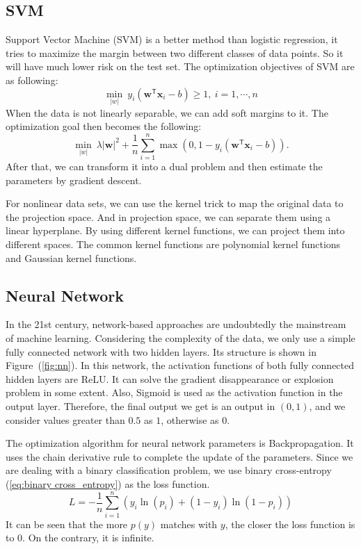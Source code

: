 \documentclass[11pt, a4paper, jou]{apa7}
\begin{document}
\subsection{SVM}
    Support Vector Machine (SVM) is a better method than logistic regression, it tries to maximize the margin between two different classes of data points. So it will have much lower risk on the test set. The optimization objectives of SVM are as following:  
    \begin{equation}
        \min_{|w|}\ y_{i}(\mathbf {w} ^{\mathsf {T}}\mathbf {x} _{i}-b)\geq 1,\ i=1, \cdots, n
    \end{equation}
    When the data is not linearly separable, we can add soft margins to it. The optimization goal then becomes the following: 
    \begin{equation}
        \min_{|w|}\ \lambda |\mathbf {w}| ^{2}+{\frac {1}{n}}\sum _{i=1}^{n}\max \left(0,1-y_{i}(\mathbf {w} ^{\mathsf {T}}\mathbf {x} _{i}-b)\right). 
    \end{equation}
    After that, we can transform it into a dual problem and then estimate the parameters by gradient descent. 

    For nonlinear data sets, we can use the kernel trick to map the original data to the projection space. And in projection space, we can separate them using a linear hyperplane. By using different kernel functions, we can project them into different spaces. The common kernel functions are polynomial kernel functions and Gaussian kernel functions. 

\subsection{Neural Network}
    In the 21st century, network-based approaches are undoubtedly the mainstream of machine learning. Considering the complexity of the data, we only use a simple fully connected network with two hidden layers. Its structure is shown in Figure~(\ref{fig:nn}). In this network, the activation functions of both fully connected hidden layers are ReLU\cite{Lu2020}. It can solve the gradient disappearance or explosion problem in some extent. Also, Sigmoid is used as the activation function in the output layer. Therefore, the final output we get is an output in $(0,1)$, and we consider values greater than $0.5$ as $1$, otherwise as $0$. 

    The optimization algorithm for neural network parameters is Backpropagation\cite{goodfellow20166}. It uses the chain derivative rule to complete the update of the parameters. Since we are dealing with a binary classification problem, we use binary cross-entropy (\ref{eq:binary cross_entropy}) as the loss function. 
    \begin{equation}
        \label{eq:binary cross_entropy}
        L = -\frac{1}{n}\sum_{i=1}^{n}(y_i\ln(p_i)+(1-y_i)\ln(1-p_i))
    \end{equation}
    It can be seen that the more $p(y)$ matches with $y$, the closer the loss function is to $0$. On the contrary, it is infinite. 
\end{document}

